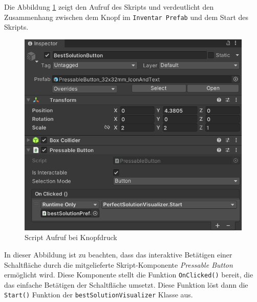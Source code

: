 Die Abbildung \ref{fig:ScrAuf} zeigt den Aufruf des Skripts und verdeutlicht den Zusammenhang zwischen dem Knopf im
\texttt{Inventar Prefab} und dem Start des Skripts.

\begin{figure}[H]
    \centering
    \includegraphics[scale=0.8]{images/perfSolBut}
    \caption{Script Aufruf bei Knopfdruck}
    \label{fig:ScrAuf}
\end{figure}

In dieser Abbildung ist zu beachten, dass das interaktive Betätigen einer Schaltfläche durch die mitgelieferte Skript-Komponente
\textit{Pressable Button} ermöglicht wird. Diese Komponente stellt die Funktion \texttt{OnClicked()} bereit, die das einfache
Betätigen der Schaltfläche umsetzt. Diese Funktion löst dann die \texttt{Start()} Funktion der \texttt{bestSolutionVisualizer}
Klasse aus.

